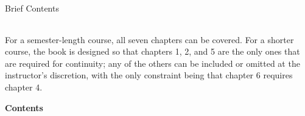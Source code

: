 \documentclass{lmseries}
\begin{document}
\myeqnspacing %
% 
\formatchtoc{\Large}{}{4mm}
\frontmatter
\yesiwantarabic
\renewcommand{\chapdir}{ch00}

\yesiwantarabic
\nomarginlayout
\onecolumn\pagebreak[4]
\noindent\huge\bfseries\sffamily{}\vspace{20mm}

\vspace{2mm}\hbox{}

\hspace{26mm}\hspace{5mm}\noindent{}Brief Contents

\vspace{0mm}\hbox{}

\hspace{20mm}\noindent\mynormaltype\Large\sffamily{}\begin{tabular}{rl}

\end{tabular}

\vspace{12mm}

\mynormaltype\sffamily{}
\noindent 
For a semester-length course, all seven chapters can be covered.
For a shorter course, the book is designed so that chapters 1, 2, and 5 are the only
ones that are required for continuity; any of the others can be included or
omitted at the instructor's discretion, with the only constraint being that
chapter 6 requires chapter 4.

\vspace{12mm}\hbox{}


\vfill
\mynormaltype

\pagebreak[4]

\vspace{0mm}
\begin{center}
\noindent\huge\bfseries\sffamily{}Contents\mynormaltype
\end{center}
\vspace{0mm}
\begin{multicols}{2}
  \tableofcontents
  \setcounter{unbalance}{0}
\end{multicols}
\normallayout\onecolumn
\end{document}
